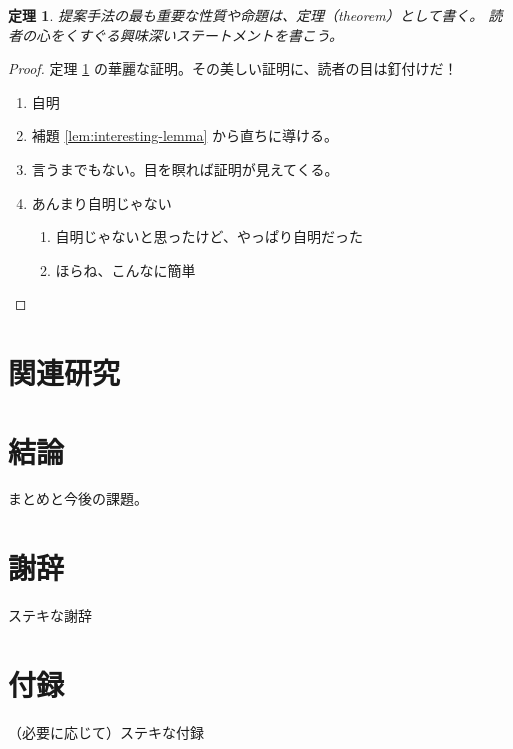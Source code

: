 \documentclass[uplatex]{sumiilab-paper}
\theoremstyle{mystyle}
\newtheorem{theorem}[definition]{定理}
\numberwithin{definition}{chapter} %
\begin{document}
\begin{theorem}
  \label{thm:wonderful-theorem}
  提案手法の最も重要な性質や命題は、定理（theorem）として書く。
  読者の心をくすぐる興味深いステートメントを書こう。
\end{theorem}

\begin{proof}
  定理 \ref{thm:wonderful-theorem} の華麗な証明。その美しい証明に、読者の目は釘付けだ！
  \begin{enumerate}[leftmargin=0pt,itemindent=*,label=Case \arabic*.]
  \item 自明
  \item 補題 \ref{lem:interesting-lemma} から直ちに導ける。
  \item 言うまでもない。目を瞑れば証明が見えてくる。
  \item あんまり自明じゃない
    \begin{enumerate}[label=(\roman*)]
    \item 自明じゃないと思ったけど、やっぱり自明だった
    \item ほらね、こんなに簡単
    \end{enumerate}
  \end{enumerate}
\end{proof}

\chapter{関連研究}
\label{c:related}

\chapter{結論}
\label{c:conclusion}

まとめと今後の課題。

\backmatter%
\chapter{謝辞}

ステキな謝辞




\appendix%
\chapter{付録}
（必要に応じて）ステキな付録
\end{document}
